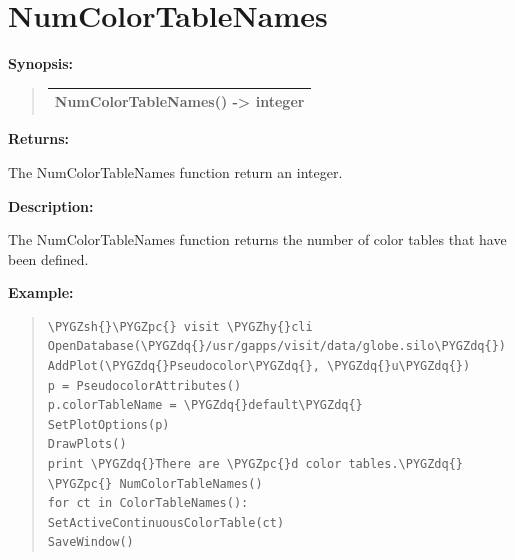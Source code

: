 \documentclass[letterpaper,10pt,english]{sphinxmanual}
\def\PYGZsh{\char`\#}
\def\PYGZpc{\char`\%}
\def\PYGZhy{\char`\-}
\def\PYGZdq{\char`\"}
\begin{document}
\section{NumColorTableNames}
\label{functions:numcolortablenames}
\begin{DUlineblock}{0em}
\item[] \textbf{Synopsis:}
\end{DUlineblock}
\begin{quote}

\begin{tabulary}{\linewidth}{|L|}
\hline

NumColorTableNames() -\textgreater{} integer
\\
\hline\end{tabulary}

\end{quote}

\begin{DUlineblock}{0em}
\item[] 
\item[] \textbf{Returns:}
\item[] The NumColorTableNames function return an integer.
\item[] 
\item[] \textbf{Description:}
\item[] The NumColorTableNames function returns the number of color tables that
have been defined.
\end{DUlineblock}

\begin{DUlineblock}{0em}
\item[] 
\end{DUlineblock}

\begin{DUlineblock}{0em}
\item[] \textbf{Example:}
\item[] 
\end{DUlineblock}
\begin{quote}

\begin{Verbatim}[commandchars=\\\{\}]
\PYGZsh{}\PYGZpc{} visit \PYGZhy{}cli
OpenDatabase(\PYGZdq{}/usr/gapps/visit/data/globe.silo\PYGZdq{})
AddPlot(\PYGZdq{}Pseudocolor\PYGZdq{}, \PYGZdq{}u\PYGZdq{})
p = PseudocolorAttributes()
p.colorTableName = \PYGZdq{}default\PYGZdq{}
SetPlotOptions(p)
DrawPlots()
print \PYGZdq{}There are \PYGZpc{}d color tables.\PYGZdq{} \PYGZpc{} NumColorTableNames()
for ct in ColorTableNames():
SetActiveContinuousColorTable(ct)
SaveWindow()
\end{Verbatim}
\end{quote}
\end{document}
